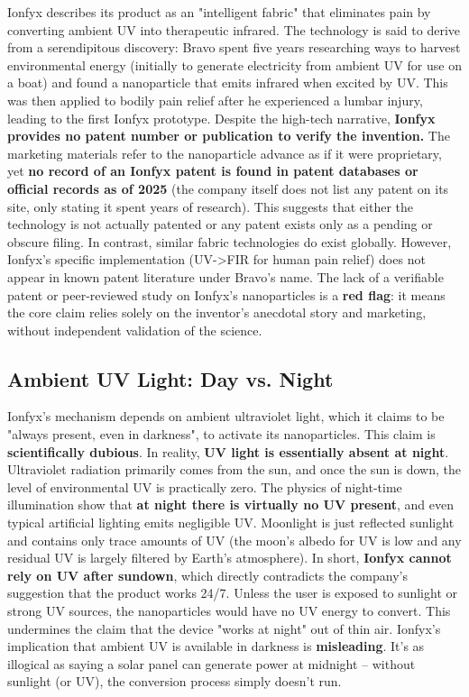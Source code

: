 \documentclass{article}
\begin{document}
Ionfyx describes its product as an "intelligent fabric" that eliminates pain by converting ambient UV into therapeutic infrared. The technology is said to derive from a serendipitous discovery: Bravo spent five years researching ways to harvest environmental energy (initially to generate electricity from ambient UV for use on a boat) and found a nanoparticle that emits infrared when excited by UV. This was then applied to bodily pain relief after he experienced a lumbar injury, leading to the first Ionfyx prototype. Despite the high-tech narrative, \textbf{Ionfyx provides no patent number or publication to verify the invention.} The marketing materials refer to the nanoparticle advance as if it were proprietary, yet \textbf{no record of an Ionfyx patent is found in patent databases or official records as of 2025} (the company itself does not list any patent on its site, only stating it spent years of research). This suggests that either the technology is not actually patented or any patent exists only as a pending or obscure filing. In contrast, similar fabric technologies do exist globally. However, Ionfyx's specific implementation (UV->FIR for human pain relief) does not appear in known patent literature under Bravo's name. The lack of a verifiable patent or peer-reviewed study on Ionfyx's nanoparticles is a \textbf{red flag}: it means the core claim relies solely on the inventor's anecdotal story and marketing, without independent validation of the science.

\subsection{Ambient UV Light: Day vs. Night}

Ionfyx's mechanism depends on ambient ultraviolet light, which it claims to be "always present, even in darkness", to activate its nanoparticles. This claim is \textbf{scientifically dubious}. In reality, \textbf{UV light is essentially absent at night}. Ultraviolet radiation primarily comes from the sun, and once the sun is down, the level of environmental UV is practically zero. The physics of night-time illumination show that \textbf{at night there is virtually no UV present}, and even typical artificial lighting emits negligible UV. Moonlight is just reflected sunlight and contains only trace amounts of UV (the moon's albedo for UV is low and any residual UV is largely filtered by Earth's atmosphere). In short, \textbf{Ionfyx cannot rely on UV after sundown}, which directly contradicts the company's suggestion that the product works 24/7. Unless the user is exposed to sunlight or strong UV sources, the nanoparticles would have no UV energy to convert. This undermines the claim that the device "works at night" out of thin air. Ionfyx's implication that ambient UV is available in darkness is \textbf{misleading}. It's as illogical as saying a solar panel can generate power at midnight – without sunlight (or UV), the conversion process simply doesn't run.
\end{document}

